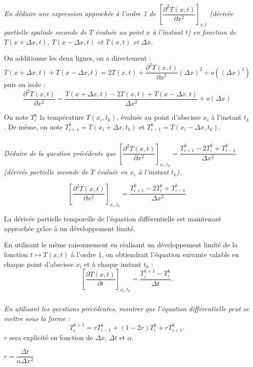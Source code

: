 \documentclass[10pt,fleqn]{article} %
\begin{document}
\begin{multicols}{2}
\subparagraph{}\textit{En déduire une expression approchée à l'ordre 1 de
 $\left[\dfrac{\partial^2 T(x,t)}{\partial x^2}\right]_{x,t}$ (dérivée partielle spatiale seconde de 
 $T$ évaluée au point $x$ à l'instant $t$) en fonction de $T(x+\Delta x,t)$, $T(x-\Delta x,t)$ et 
$T(x,t)$ et $\Delta x$.}
\ifprof
\begin{corrige}
On additionne les deux lignes, on a directement :
$$
T(x+\Delta x,t)+T(x-\Delta x,t)=2T(x,t)
+ \dfrac{\partial^2 T(x,t)}{\partial x^2}(\Delta x)^2
+o((\Delta x)^3)$$
puis on isole : 
$$
\dfrac{\partial^2 T(x,t)}{\partial x^2} 
=
\dfrac{T(x+\Delta x,t)-2T(x,t) + T(x-\Delta x,t)}{\Delta x^2 }+ o\left(\Delta x\right)
$$
\end{corrige}

\else
\fi

\vspace{.5cm}

On note $T_i^k$ la température $T\left(x_i,t_k\right)$, évaluée au point d'abscisse $x_i$ à
 l'instant $t_k$. De même, on note $T_{i+1}^k=T\left(x_i + \Delta x,t_k \right)$ et 
$T_{i-1}^k=T\left(x_i - \Delta x,t_k \right)$.

\subparagraph{}\textit{Déduire de la question précédente que  
$\left[\dfrac{\partial^2 T(x,t)}{\partial x^2}\right]_{x_i,t_k} =
\dfrac{T_{i+1}^k-2T_{i}^k + T_{i-1}^k}{\Delta x^2 } $ (dérivée partielle seconde de 
$T$ évaluée en $x_i$ à l'instant $t_k$).}
\ifprof
\begin{corrige}
$$
\left[\dfrac{\partial^2 T(x,t)}{\partial x^2}\right]_{x_i,t_k} 
=
\dfrac{T_{i+1}^k-2T_{i}^k + T_{i-1}^k}{\Delta x^2 }
$$
\end{corrige}
\else
\fi
\ifprof
\else
\vspace{0.5cm}
La dérivée partielle temporelle de l'équation différentielle est maintenant approchée grâce à un
développement limité.

En utilisant le même raisonnement en réalisant un développement limité de la fonction 
$t\mapsto T(x,t)$ à l'ordre $1$, on obtiendrait l'équation suivante valable en chaque point
 d'abscisse $x_i$ et à chaque instant $t_k$ : 
$$
\left[\dfrac{\partial T(x,t)}{\partial t}\right]_{x_i,t_k} 
=
\dfrac{T_{i}^{k+1}- T_{i}^k}{\Delta t }.
$$
\fi



\subparagraph{}\textit{En utilisant les questions précédentes, montrer que 
l'équation différentielle peut se mettre sous la forme : 
$$
T_{i}^{k+1} = r T_{i-1}^{k} + \left( 1-2r \right) T_i^k + r T_{i+1}^k.
$$ 
}
$r$ sera explicité en fonction de $\Delta x$, $\Delta t$ et $\alpha$.
\ifprof
\begin{corrige}
$r=\dfrac{\Delta t}{\alpha \Delta x^2}$
\end{corrige}
\else
\fi


\end{multicols}
\end{document}
